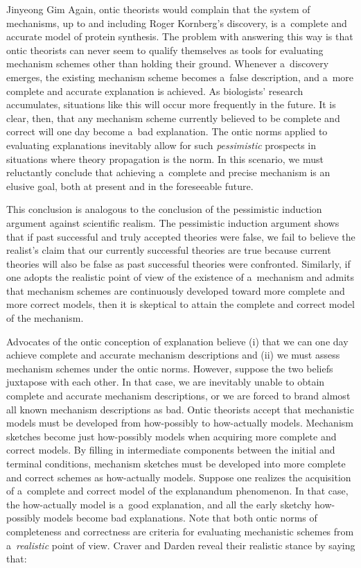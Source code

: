 \begin{artengenv}{Jinyeong Gim}
Again, ontic theorists would complain that the system of mechanisms, up to and including Roger Kornberg's discovery, is a~complete and accurate model of protein synthesis. The problem with answering this way is that ontic theorists can never seem to qualify themselves as tools for evaluating mechanism schemes other than holding their ground. Whenever a~discovery emerges, the existing mechanism scheme becomes a~false description, and a~more complete and accurate explanation is achieved. As biologists' research accumulates, situations like this will occur more frequently in the future. It is clear, then, that any mechanism scheme currently believed to be complete and correct will one day become a~bad explanation. The ontic norms applied to evaluating explanations inevitably allow for such \textit{pessimistic} prospects in situations where theory propagation is the norm. In this scenario, we must reluctantly conclude that achieving a~complete and precise mechanism is an elusive goal, both at present and in the foreseeable future.

This conclusion is analogous to the conclusion of the pessimistic induction argument against scientific realism. The pessimistic induction argument shows that if past successful and truly accepted theories were false, we fail to believe the realist's claim that our currently successful theories are true because current theories will also be false as past successful theories were confronted. Similarly, if one adopts the realistic point of view of the existence of a~mechanism and admits that mechanism schemes are continuously developed toward more complete and more correct models, then it is skeptical to attain the complete and correct model of the mechanism.

Advocates of the ontic conception of explanation believe (i) that we can one day achieve complete and accurate mechanism descriptions and (ii) we must assess mechanism schemes under the ontic norms. However, suppose the two beliefs juxtapose with each other. In that case, we are inevitably unable to obtain complete and accurate mechanism descriptions, or we are forced to brand almost all known mechanism descriptions as bad. Ontic theorists accept that mechanistic models must be developed from how-possibly to how-actually models. Mechanism sketches become just how-possibly models when acquiring more complete and correct models. By filling in intermediate components between the initial and terminal conditions, mechanism sketches must be developed into more complete and correct schemes as how-actually models. Suppose one realizes the acquisition of a~complete and correct model of the explanandum phenomenon. In that case, the how-actually model is a~good explanation, and all the early sketchy how-possibly models become bad explanations. Note that both ontic norms of completeness and correctness are criteria for evaluating mechanistic schemes from a~\textit{realistic} point of view. Craver and Darden reveal their realistic stance by saying that:


\end{artengenv}
